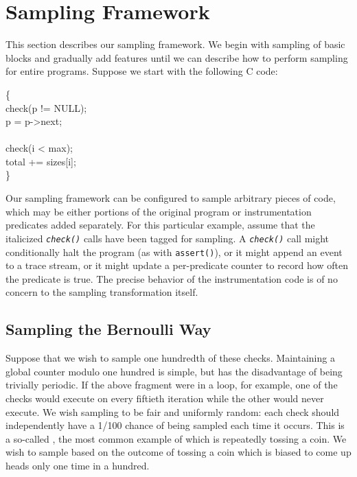 \section{Sampling Framework}
\label{sec:framework}

This section describes our sampling framework.  We begin with sampling
of basic blocks and gradually add features until we can describe how
to perform sampling for entire programs.  Suppose we start with the
following C code:

\begin{code}
  \{\+ \\
  check(p != NULL); \\
  \up p = p->next; \\
  \\
  check(i < max); \\
  \up total += sizes[i]; \\
  \<\}
\end{code}

Our sampling framework can be configured to sample arbitrary pieces of
code, which may be either portions of the original program or
instrumentation predicates added separately.  For this particular
example, assume that the italicized \texttt{\textit{check()}} calls
have been tagged for sampling.  A \texttt{\textit{check()}} call might
conditionally halt the program (as with \texttt{assert()}), or it
might append an event to a trace stream, or it might update a
per-predicate counter to record how often the predicate is true.  The
precise behavior of the instrumentation code is of no concern to the
sampling transformation itself.

\subsection{Sampling the Bernoulli Way}

Suppose that we wish to sample one hundredth of these checks.
Maintaining a global counter modulo one hundred is simple, but has the
disadvantage of being trivially periodic.  If the above fragment were
in a loop, for example, one of the checks would execute on every
fiftieth iteration while the other would never execute.  We wish
sampling to be fair and uniformly random: each check should independently have a
1/100 chance of being sampled each time it occurs.  This is a
so-called , the most common example of
which is repeatedly tossing a coin.  We wish to sample based on the
outcome of tossing a coin which is biased to come up heads only one
time in a hundred.

